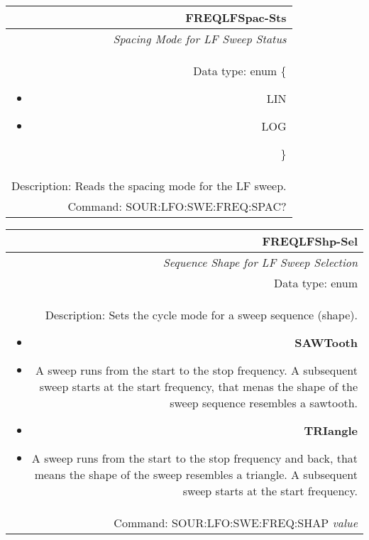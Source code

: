 \documentclass[openany]{article}
\begin{document}
		\begin{tabular}{N}
			\hline
			\bfseries FREQLFSpac-Sts \\ \hline
			\emph{Spacing Mode for LF Sweep Status} \\
			Data type: enum \{\begin{itemize}[noitemsep]
				\small
				\item[] LIN
				\item[] LOG
			\end{itemize}\} \\ 
			Description: Reads the spacing mode for the LF sweep. \\
			Command: SOUR:LFO:SWE:FREQ:SPAC? \\

		\end{tabular}
%
		\begin{tabular}{N}
			\hline
			\bfseries FREQLFShp-Sel \\ \hline
			\emph{Sequence Shape for LF Sweep Selection} \\
			Data type: enum \\ 
			Description: Sets the cycle mode for a sweep sequence (shape).\begin{itemize}[noitemsep]
				\small
				\item[] \textbf{SAWTooth} 
				\item[]	A sweep runs from the start to the stop frequency. A subsequent sweep starts at the start frequency, that menas the shape of the sweep sequence resembles a sawtooth.
				\item[] \textbf{TRIangle}
				\item[] A sweep runs from the start to the stop frequency and back, that means the shape of the sweep resembles a triangle. A subsequent sweep starts at the start frequency.
			\end{itemize} \\
			Command: SOUR:LFO:SWE:FREQ:SHAP \emph{value} \\

		\end{tabular}
\end{document}
